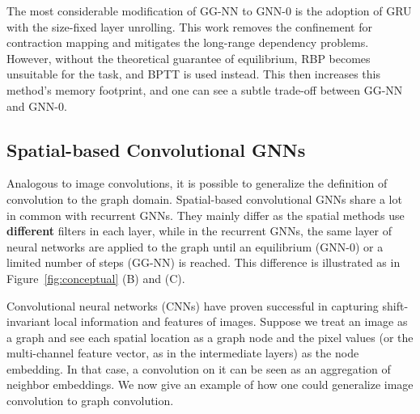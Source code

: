 The most considerable modification of GG-NN to GNN-0 is the adoption of GRU with the size-fixed layer unrolling. This work removes the confinement for contraction mapping and mitigates the long-range dependency problems. However, without the theoretical guarantee of equilibrium, RBP becomes unsuitable for the task, and BPTT is used instead. This then increases this method's memory footprint, and one can see a subtle trade-off between GG-NN and GNN-0.




\subsection{Spatial-based Convolutional GNNs}
\label{sec:spatial}
Analogous to image convolutions, it is possible to generalize the definition of convolution to the graph domain. Spatial-based convolutional GNNs share a lot in common with recurrent GNNs. They mainly differ as the spatial methods use \textbf{different} filters in each layer, while in the recurrent GNNs, the same layer of neural networks are applied to the graph until an equilibrium (GNN-0) or a limited number of steps (GG-NN) is reached. This difference is illustrated as in Figure~\ref{fig:conceptual} (B) and (C).

Convolutional neural networks (CNNs) have proven successful in capturing shift-invariant local information and features of images. Suppose we treat an image as a graph and see each spatial location as a graph node and the pixel values (or the multi-channel feature vector, as in the intermediate layers) as the node embedding. In that case, a convolution on it can be seen as an aggregation of neighbor embeddings. We now give an example of how one could generalize image convolution to graph convolution. 

